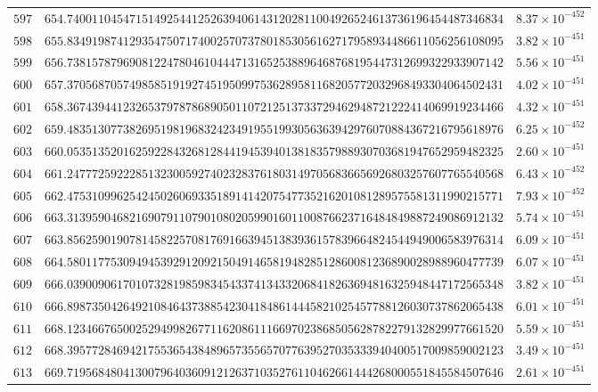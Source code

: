 \documentclass[12pt,reqno]{amsart}
\theoremstyle{remark}
\begin{document}
\begin{longtable}{clc}
$597$ & $654.7400110454715149254412526394061431202811004926524613736196454487346834$ & $8.37\times 10^{-452}$ \\
$598$ & $655.8349198741293547507174002570737801853056162717958934486611056256108095$ & $3.82\times 10^{-451}$ \\
$599$ & $656.7381578796908122478046104447131652538896468768195447312699322933907142$ & $5.56\times 10^{-451}$ \\
$600$ & $657.3705687057498585191927451950997536289581168205772032968493304064502431$ & $4.02\times 10^{-451}$ \\
$601$ & $658.3674394412326537978786890501107212513733729462948721222414069919234466$ & $4.32\times 10^{-451}$ \\
$602$ & $659.4835130773826951981968324234919551993056363942976070884367216795618976$ & $6.25\times 10^{-452}$ \\
$603$ & $660.0535135201625922843268128441945394013818357988930703681947652959482325$ & $2.60\times 10^{-451}$ \\
$604$ & $661.2477725922285132300592740232837618031497056836656926803257607765540568$ & $6.43\times 10^{-452}$ \\
$605$ & $662.4753109962542450260693351891414207547735216201081289575581311990215771$ & $7.93\times 10^{-452}$ \\
$606$ & $663.3139590468216907911079010802059901601100876623716484849887249086912132$ & $5.74\times 10^{-451}$ \\
$607$ & $663.8562590190781458225708176916639451383936157839664824544949006583976314$ & $6.09\times 10^{-451}$ \\
$608$ & $664.5801177530949453929120921504914658194828512860081236890028988960477739$ & $6.07\times 10^{-451}$ \\
$609$ & $666.0390090617010732819859834543374134332068418263694816325948447172565348$ & $3.82\times 10^{-451}$ \\
$610$ & $666.8987350426492108464373885423041848614445821025457788126030737862065438$ & $6.01\times 10^{-451}$ \\
$611$ & $668.1234667650025294998267711620861116697023868505628782279132829977661520$ & $5.59\times 10^{-451}$ \\
$612$ & $668.3957728469421755365438489657355657077639527035333940400517009859002123$ & $3.49\times 10^{-451}$ \\
$613$ & $669.7195684804130079640360912126371035276110462661444268000551845584507646$ & $2.61\times 10^{-451}$ \\

\end{longtable}
\end{document}
